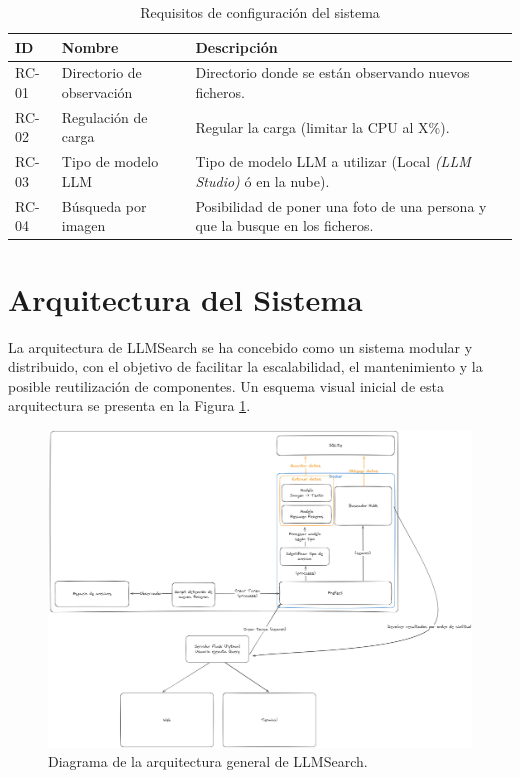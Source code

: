 \begin{table}[H]
\centering
\begin{tabular}{|p{1cm}|p{4cm}|p{9cm}|}
\hline
\textbf{ID} & \textbf{Nombre} & \textbf{Descripción} \\
\hline
RC-01 & Directorio de observación & Directorio donde se están observando nuevos ficheros. \\
\hline
RC-02 & Regulación de carga & Regular la carga (limitar la CPU al X\%). \\
\hline
RC-03 & Tipo de modelo LLM & Tipo de modelo LLM a utilizar (Local \textit{(LLM Studio)} ó en la nube). \\
\hline
RC-04 & Búsqueda por imagen & Posibilidad de poner una foto de una persona y que la busque en los ficheros. \\
\hline
\end{tabular}
\caption{Requisitos de configuración del sistema}
\label{tab:req_configuracion}
\end{table}

\section{Arquitectura del Sistema}
\label{sec:arquitectura_sistema}

La arquitectura de LLMSearch se ha concebido como un sistema modular y distribuido, con el objetivo de facilitar la escalabilidad, el mantenimiento y la posible reutilización de componentes. Un esquema visual inicial de esta arquitectura se presenta en la Figura \ref{fig:arquitectura_general}.

\begin{figure}[H]
  \centering
  \includegraphics[width=\textwidth]{archivos/arquitectura.png}
  \caption[Arquitectura de LLMSearch]{Diagrama de la arquitectura general de LLMSearch.}
  \label{fig:arquitectura_general}
\end{figure}

